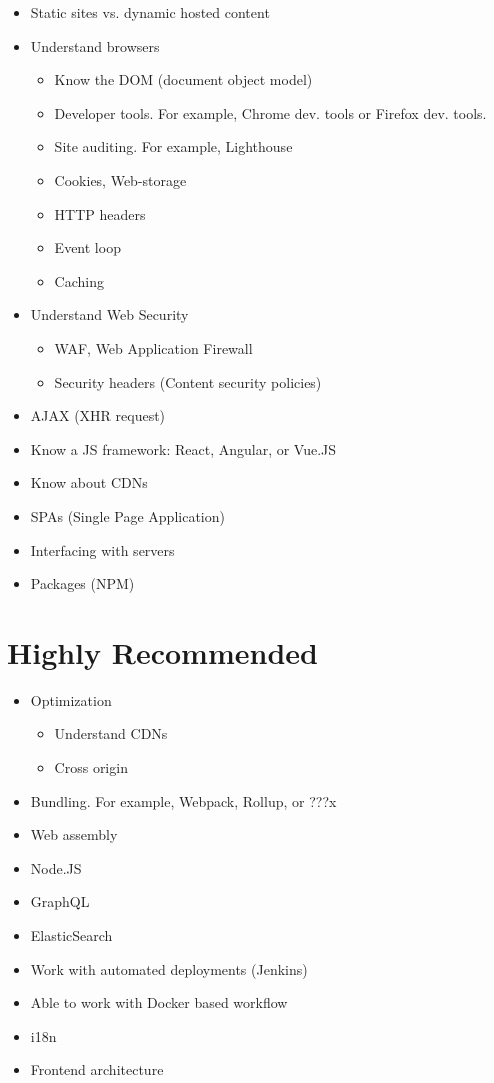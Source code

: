 \documentclass[12pt]{article}
\begin{document}
\begin{itemize}
\item Static sites vs. dynamic hosted content
\item Understand browsers
  \begin{itemize}
  \item Know the DOM (document object model)
  \item Developer tools.  For example, Chrome dev. tools or Firefox dev. tools.
  \item Site auditing.  For example, Lighthouse
  \item Cookies, Web-storage
  \item HTTP headers
  \item Event loop
  \item Caching
  \end{itemize}
\item Understand Web Security
  \begin{itemize}
  \item WAF, Web Application Firewall
  \item Security headers (Content security policies)
  \end{itemize}
\item AJAX (XHR request)
\item Know a JS framework: React, Angular, or Vue.JS
\item Know about CDNs
\item SPAs (Single Page Application)
\item Interfacing with servers
\item Packages (NPM)
\end{itemize}

\section{Highly Recommended}

\begin{itemize}
\item Optimization
  \begin{itemize}
  \item Understand CDNs
  \item Cross origin
  \end{itemize}
\item Bundling.  For example, Webpack, Rollup, or ???x
\item Web assembly
\item Node.JS
\item GraphQL
\item ElasticSearch
\item Work with automated deployments (Jenkins)
\item Able to work with Docker based workflow
\item i18n
\item Frontend architecture
\end{itemize}
\end{document}
